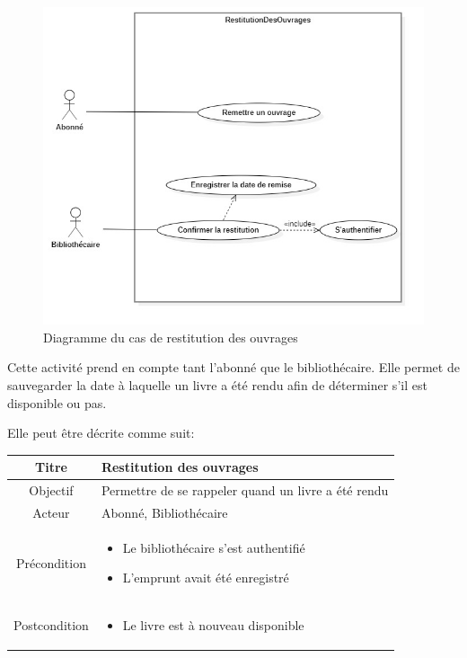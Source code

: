 \paragraph{}
\begin{figure}[h]
        \centering
        \includegraphics[width=1\textwidth]{restitutionDesOuvragesUseCase}
        \caption{Diagramme du cas de restitution des ouvrages}
        \label{image-restitutionDesOuvragesUseCase}
        \end{figure}
\par
Cette activité prend en compte tant l'abonné que le bibliothécaire. Elle permet de sauvegarder la 
date à laquelle un livre a été  rendu afin de déterminer s'il est disponible ou pas. \par 
Elle peut être décrite comme suit: \par 
\begin{tabular}{|c|p{7cm}|}
        \hline
        Titre & Restitution des ouvrages \\
        \hline
        Objectif & Permettre de se rappeler quand un livre a été rendu \\
        \hline
        Acteur & Abonné, Bibliothécaire \\
        \hline
        Précondition & \begin{itemize}
                \item Le bibliothécaire s'est authentifié 
                \item L'emprunt avait été enregistré
        \end{itemize} \\
        \hline
        Postcondition & \begin{itemize}
                \item Le livre est à nouveau disponible
        \end{itemize} \\
        \hline
\end{tabular}
